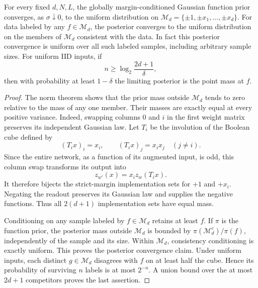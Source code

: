 \begin{corollary}
For every fixed $d,N,L$, the globally margin-conditioned Gaussian function
prior converges, as $\sigma\downarrow0$, to the uniform distribution on
$\mathcal M_d=\{\pm1,\pm x_1,\ldots,\pm x_d\}$.
For data labeled by any $f\in\mathcal M_d$, the posterior converges to the
uniform distribution on the members of $\mathcal M_d$ consistent with the
data. In fact this posterior convergence is uniform over all such labeled
samples, including arbitrary sample sizes.
For uniform IID inputs, if
\[
 n\ge\log_2\frac{2d+1}{\delta},
\]
then with probability at least $1-\delta$ the limiting posterior is the point
mass at $f$.
\end{corollary}

\begin{proof}
The norm theorem shows that the prior mass outside $\mathcal M_d$ tends to
zero relative to the mass of any one member. Their masses are exactly equal
at every positive variance. Indeed, swapping columns $0$ and $i$ in the first
weight matrix preserves its independent Gaussian law. Let $T_i$ be the
involution of the Boolean cube defined by
\[
 (T_i x)_i=x_i,\qquad (T_i x)_j=x_i x_j\quad(j\ne i).
\]
Since the entire network, as a function of its augmented input, is odd, this
column swap transforms its output into
\[
 z_{w'}(x)=x_i z_w(T_i x).
\]
It therefore bijects the strict-margin implementation sets for $+1$ and
$+x_i$. Negating the readout preserves its Gaussian law and supplies the
negative functions. Thus all $2(d+1)$ implementation sets have equal mass.

Conditioning on any sample labeled by $f\in\mathcal M_d$ retains at least
$f$. If $\pi$ is the function prior, the posterior mass outside
$\mathcal M_d$ is bounded by $\pi(\mathcal M_d^c)/\pi(f)$, independently of
the sample and its size. Within $\mathcal M_d$, consistency conditioning is
exactly uniform. This proves the posterior convergence claim.
Under uniform inputs, each distinct $g\in\mathcal M_d$ disagrees with $f$ on
at least half the cube. Hence its probability of surviving $n$ labels is at
most $2^{-n}$. A union bound over the at most $2d+1$ competitors proves the
last assertion.
\end{proof}
